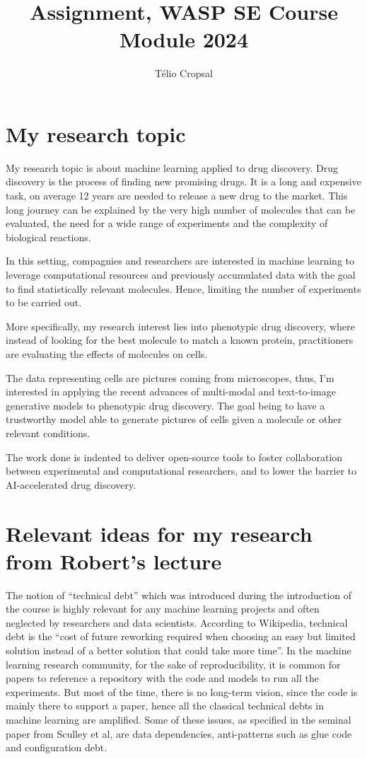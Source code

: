 \documentclass[11pt,a4paper]{article}
\title{Assignment, WASP SE Course Module 2024}
\author{Télio Cropsal}
\begin{document}

\maketitle

\section{My research topic}
My research topic is about machine learning applied to drug discovery. Drug discovery is the process of finding new promising drugs. It is a long and expensive task, on average 12 years are needed to release a new drug to the market. This long journey can be explained by the very high number of molecules that can be evaluated, the need for a wide range of experiments and the complexity of biological reactions.

In this setting, compagnies and researchers are interested in machine learning to leverage computational resources and previously accumulated data with the goal to find statistically relevant molecules. Hence, limiting the number of experiments to be carried out.

More specifically, my research interest lies into phenotypic drug discovery, where instead of looking for the best molecule to match a known protein, practitioners are evaluating the effects of molecules on cells.

The data representing cells are pictures coming from microscopes, thus, I’m interested in applying the recent advances of multi-modal and text-to-image generative models to phenotypic drug discovery. The goal being to have a trustworthy model able to generate pictures of cells given a molecule or other relevant conditions.

The work done is indented to deliver open-source tools to foster collaboration between experimental and computational researchers, and to lower the barrier to AI-accelerated drug discovery.
\section{Relevant ideas for my research from Robert’s lecture}
The notion of “technical debt” which was introduced during the introduction of the course is highly relevant for any machine learning projects and often neglected by researchers and data scientists. According to Wikipedia, technical debt is the “cost of future reworking required when choosing an easy but limited solution instead of a better solution that could take more time”. In the machine learning research community, for the sake of reproducibility, it is common for papers to reference a repository with the code and models to run all the experiments. But most of the time, there is no long-term vision, since the code is mainly there to support a paper, hence all the classical technical debts in machine learning are amplified. Some of these issues, as specified in the seminal paper from Sculley et al, are data dependencies, anti-patterns such as glue code and configuration debt.
\end{document}

